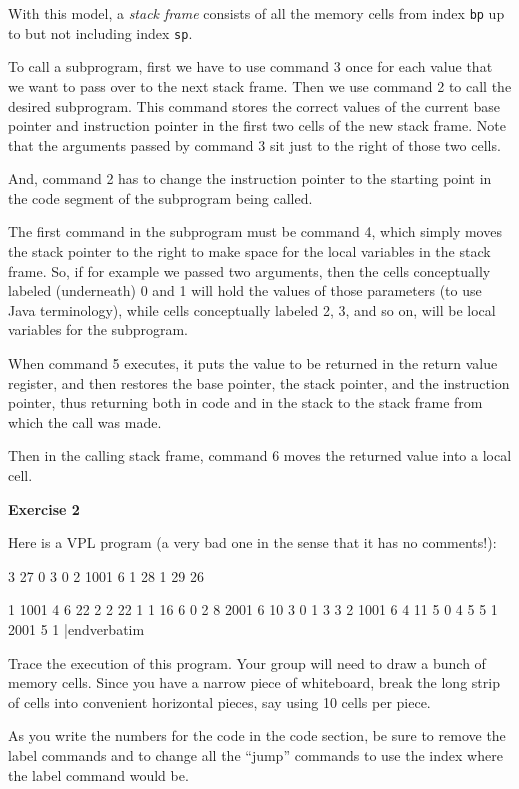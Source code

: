 With this model, a {\it stack frame\/} consists of all the memory cells from index {\tt bp} up to
but not including index {\tt sp}.
\medskip

To call a subprogram, first we have to use command 3 once for each value that we want to
pass over to the next stack frame.
Then we use command 2 to call the desired subprogram.
This command stores the correct values of the current base pointer and instruction pointer in the
first two cells of the new stack frame.
Note that the arguments passed by command 3 sit just to the right of those two cells.
\medskip

And, command 2 has to change the instruction pointer to the starting point in the code segment
of the subprogram being called.
\medskip

The first command in the subprogram must be command 4, which simply moves the stack pointer
to the right to make space for the local variables in the stack frame.
So, if for example we passed two arguments, then the cells conceptually labeled (underneath) 0 and
1 will hold the values of those parameters (to use Java terminology), while cells conceptually
labeled 2, 3, and so on, will be local variables for the subprogram.
\medskip

When command 5 executes, it puts the value to be returned in the return value register, and
then restores the base pointer, the stack pointer, and the instruction pointer, thus returning both in
code and in the stack to the stack frame from which the call was made.
\medskip

Then in the calling stack frame, command 6 moves the returned value into a local cell.
\border

{\bf Exercise 2}
\medskip

Here is a VPL program (a very bad one in the sense that it has no comments!):
\medskip

 3
27 0
3 0
2 1001 
6 1
28 1
29 
26

1 1001
4 6
22 2 2 
22 1 1
16 6 0 2
8 2001 6
10 3 0 1
3 3
2 1001
6 4
11 5 0 4
5 5
1 2001
5 1
|endverbatim
\medskip
\bigskip

Trace the execution of this program.
Your group will need to draw a bunch of memory cells.
Since you have a narrow piece of whiteboard, break the long strip of
cells into convenient horizontal pieces, say using 10 cells per piece.
\medskip

As you write the numbers for the code in the code section, be sure to
remove the label commands and to change all the ``jump'' commands to
use the index where the label command would be.
\medskip

